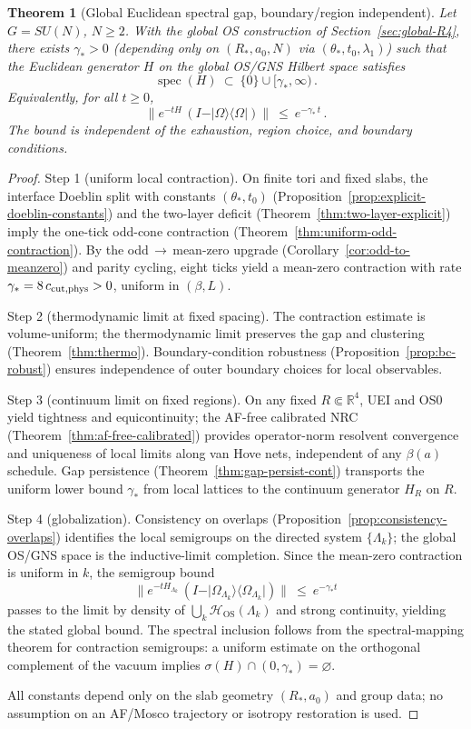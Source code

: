 \documentclass[11pt]{amsart}
\theoremstyle{plain}
\newtheorem{theorem}{Theorem}[section]
\theoremstyle{definition}
\theoremstyle{remark}
\begin{document}
\begin{theorem}[Global Euclidean spectral gap, boundary/region independent]\label{thm:global-gap-uncond}
Let $G=SU(N)$, $N\ge 2$. With the global OS construction of Section~\ref{sec:global-R4}, there exists $\gamma_*>0$ (depending only on $(R_*,a_0,N)$ via $(\theta_*,t_0,\lambda_1)$) such that the Euclidean generator $H$ on the global OS/GNS Hilbert space satisfies
\[
  \operatorname{spec}(H)\ \subset\ \{0\}\cup[\gamma_*,\infty)\,.
\]
Equivalently, for all $t\ge 0$,
\[
  \big\|e^{-tH}\,(I-\vert\Omega\rangle\langle\Omega\vert)\big\|\ \le\ e^{-\gamma_*\, t}\,.
\]
The bound is independent of the exhaustion, region choice, and boundary conditions.
\end{theorem}
\begin{proof}
Step 1 (uniform local contraction). On finite tori and fixed slabs, the interface Doeblin split with constants $(\theta_*,t_0)$ (Proposition~\ref{prop:explicit-doeblin-constants}) and the two-layer deficit (Theorem~\ref{thm:two-layer-explicit}) imply the one-tick odd-cone contraction (Theorem~\ref{thm:uniform-odd-contraction}). By the odd\,$\to$\,mean-zero upgrade (Corollary~\ref{cor:odd-to-meanzero}) and parity cycling, eight ticks yield a mean-zero contraction with rate $\gamma_*=8\,c_{\rm cut,phys}>0$, uniform in $(\beta,L)$.

Step 2 (thermodynamic limit at fixed spacing). The contraction estimate is volume-uniform; the thermodynamic limit preserves the gap and clustering (Theorem~\ref{thm:thermo}). Boundary-condition robustness (Proposition~\ref{prop:bc-robust}) ensures independence of outer boundary choices for local observables.

Step 3 (continuum limit on fixed regions). On any fixed $R\Subset\mathbb R^4$, UEI and OS0 yield tightness and equicontinuity; the AF-free calibrated NRC (Theorem~\ref{thm:af-free-calibrated}) provides operator-norm resolvent convergence and uniqueness of local limits along van Hove nets, independent of any $\beta(a)$ schedule. Gap persistence (Theorem~\ref{thm:gap-persist-cont}) transports the uniform lower bound $\gamma_*$ from local lattices to the continuum generator $H_R$ on $R$.

Step 4 (globalization). Consistency on overlaps (Proposition~\ref{prop:consistency-overlaps}) identifies the local semigroups on the directed system $\{\Lambda_k\}$; the global OS/GNS space is the inductive-limit completion. Since the mean-zero contraction is uniform in $k$, the semigroup bound
\[
  \big\|e^{-tH_{\Lambda_k}}\,(I-\vert\Omega_{\Lambda_k}\rangle\langle\Omega_{\Lambda_k}\vert)\big\|\ \le\ e^{-\gamma_* t}
\]
passes to the limit by density of $\bigcup_k \mathcal H_{\mathrm{OS}}(\Lambda_k)$ and strong continuity, yielding the stated global bound. The spectral inclusion follows from the spectral-mapping theorem for contraction semigroups: a uniform estimate on the orthogonal complement of the vacuum implies $\sigma(H)\cap (0,\gamma_*)=\varnothing$.

All constants depend only on the slab geometry $(R_*,a_0)$ and group data; no assumption on an AF/Mosco trajectory or isotropy restoration is used.
\end{proof}
\end{document}
